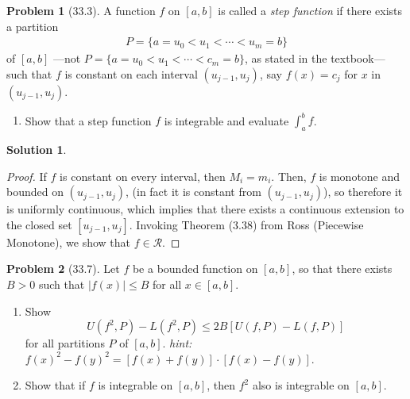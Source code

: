 \documentclass[12pt]{article}
\theoremstyle{definition} %
\newtheorem{solution}{Solution}
\newtheorem{problem}{Problem}
\theoremstyle{plain} %
\begin{document}
\begin{problem}[33.3]

    \noindent A function $ f $ on $[a, b]$ is called a \emph{step function} if there exists a partition 
    \begin{align}    
    P = \{a = u_0 < u_1 < \cdots < u_m = b\}
    \end{align}
    of $[a, b]$ —not $ P = \{a = u_0 < u_1 < \cdots < c_m = b\} $, as stated in the textbook— such that $ f $ is constant on each interval $(u_{j-1}, u_j)$, say $ f(x) = c_j $ for $ x $ in $(u_{j-1}, u_j)$.
    
    \begin{enumerate}
        \item Show that a step function $ f $ is integrable and evaluate $ \int_a^b f $.
    \end{enumerate}
    
\end{problem}
\begin{solution}
   \begin{proof}
    If $f$ is constant on every interval, then $M_i = m_i$. Then, $f$ is monotone and bounded on $\left( u_{j-1}, u_{j} \right) $, (in fact it is constant from $\left( u_{j-1},u_{j} \right) $), so therefore it is uniformly continuous, which implies that
    there exists a continuous extension to the closed set $[u_{j-1}, u_{j}] $. Invoking Theorem (3.38) from Ross (Piecewise Monotone), we show that $f\in \mathcal{R}$.   
   \end{proof} 
\end{solution}
\begin{problem}[33.7]
    Let $ f $ be a bounded function on $[a, b]$, so that there exists $ B > 0 $ such that $ |f(x)| \leq B $ for all $ x \in [a, b] $.

\begin{enumerate}
    \item Show
    $$
    U(f^2, P) - L(f^2, P) \leq 2B[U(f, P) - L(f, P)]
    $$
    for all partitions $ P $ of $[a, b]$. \emph{hint:} $ f(x)^2 - f(y)^2 = [f(x) + f(y)] \cdot [f(x) - f(y)] $.
    \item Show that if $ f $ is integrable on $[a, b]$, then $ f^2 $ also is integrable on $[a, b]$.
\end{enumerate}
\end{problem}
\end{document}
